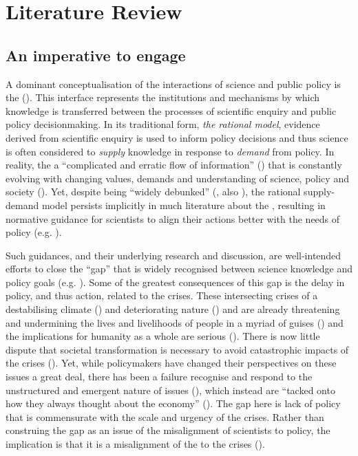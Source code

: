 \chapter{Literature Review}\label{ch:lit}

\section{An imperative to engage}\label{sec:litspi}

A dominant conceptualisation of the interactions of science and public policy is the \SPI{} (\cite{JagannathanEtAl2023}). This interface represents the institutions and mechanisms by which knowledge is transferred between the processes of scientific enquiry and public policy decisionmaking. In its traditional form, \emph{the rational model}, evidence derived from scientific enquiry is used to inform policy decisions and thus science is often considered to \emph{supply} knowledge in response to \emph{demand} from policy. In reality, the \SPI{} a ``complicated and erratic flow of information'' (\cite{BednarekSHG2015}) that is constantly evolving with changing values, demands and understanding of science, policy and society (\cite{Obermeister2020}). Yet, despite being ``widely debunked'' (\cite{BoswellS2017}, also \cite{McNie2007,HaynesDCRHGS2011,Cairney2018}), the rational supply-demand model persists implicitly in much literature about the \SPI, resulting in normative guidance for scientists to align their actions better with the needs of policy (e.g. \cite{McNie2007,GeddesDP2018,BlessenohlS2022,Bisbal2024}).

Such guidances, and their underlying research and discussion, are well-intended efforts to close the ``gap'' that is widely recognised between science knowledge and policy goals (e.g. \cite{RapleyD2014,KarlssonG2020,CairneyTS2023}). Some of the greatest consequences of this gap is the delay in policy, and thus action, related to the \CAN{} crises. These intersecting crises of a destabilising climate (\cite{IIPCC2022}) and deteriorating nature (\cite{IPBES2022}) and are already threatening and undermining the lives and livelihoods of people in a myriad of guises (\cite{TschakertEAKO2019}) and the implications for humanity as a whole are serious (\cite{McKayEtAl2022,WEF2024}). There is now little dispute that societal transformation is necessary to avoid catastrophic impacts of the \CAN{} crises (\cite{LaybournTS2023}). Yet, while policymakers have changed their perspectives on these issues a great deal, there has been a failure recognise and respond to the unstructured and emergent nature of \CAN{} issues (\cite{FuntowiczR1993,WesselinkH2020}), which instead are ``tacked onto how they always thought about the economy'' (\cite[p118]{Killick2023}). The gap here is lack of policy that is commensurate with the scale and urgency of the \CAN{} crises. Rather than construing the gap as an issue of the misalignment of scientists to policy, the implication is that it is a misalignment of the \SPI{} to the \CAN{} crises (\cite{BalvaneraJNOBCDGGKKMPSSW2020}).

